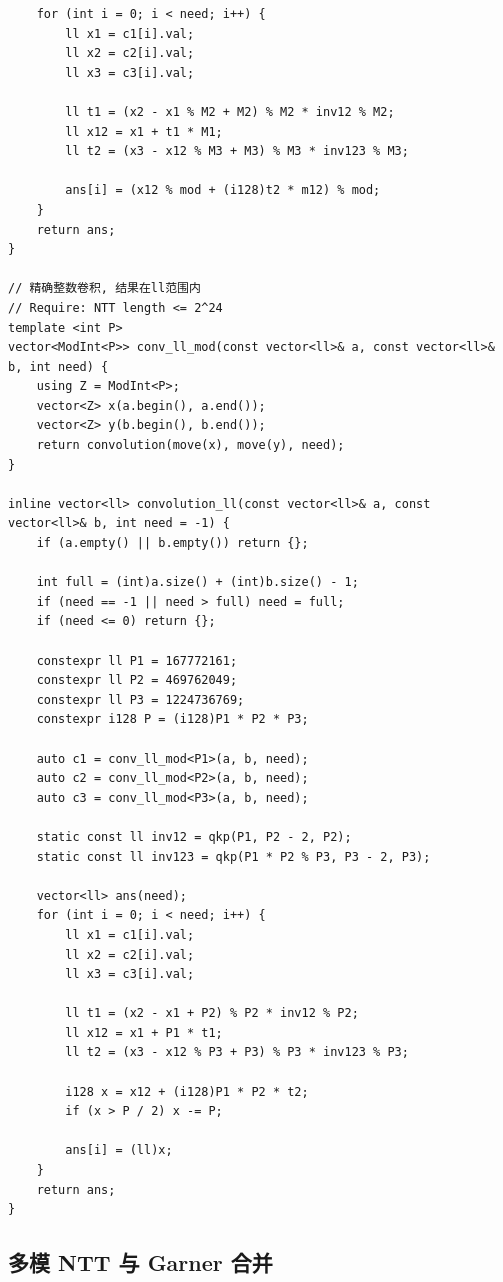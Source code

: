 \begin{lstlisting}
    for (int i = 0; i < need; i++) {
        ll x1 = c1[i].val;
        ll x2 = c2[i].val;
        ll x3 = c3[i].val;

        ll t1 = (x2 - x1 % M2 + M2) % M2 * inv12 % M2;
        ll x12 = x1 + t1 * M1;
        ll t2 = (x3 - x12 % M3 + M3) % M3 * inv123 % M3;

        ans[i] = (x12 % mod + (i128)t2 * m12) % mod;
    }
    return ans;
}

// 精确整数卷积, 结果在ll范围内
// Require: NTT length <= 2^24
template <int P>
vector<ModInt<P>> conv_ll_mod(const vector<ll>& a, const vector<ll>& b, int need) {
    using Z = ModInt<P>;
    vector<Z> x(a.begin(), a.end());
    vector<Z> y(b.begin(), b.end());
    return convolution(move(x), move(y), need);
}

inline vector<ll> convolution_ll(const vector<ll>& a, const vector<ll>& b, int need = -1) {
    if (a.empty() || b.empty()) return {};

    int full = (int)a.size() + (int)b.size() - 1;
    if (need == -1 || need > full) need = full;
    if (need <= 0) return {};

    constexpr ll P1 = 167772161;
    constexpr ll P2 = 469762049;
    constexpr ll P3 = 1224736769;
    constexpr i128 P = (i128)P1 * P2 * P3;

    auto c1 = conv_ll_mod<P1>(a, b, need);
    auto c2 = conv_ll_mod<P2>(a, b, need);
    auto c3 = conv_ll_mod<P3>(a, b, need);

    static const ll inv12 = qkp(P1, P2 - 2, P2);
    static const ll inv123 = qkp(P1 * P2 % P3, P3 - 2, P3);

    vector<ll> ans(need);
    for (int i = 0; i < need; i++) {
        ll x1 = c1[i].val;
        ll x2 = c2[i].val;
        ll x3 = c3[i].val;

        ll t1 = (x2 - x1 + P2) % P2 * inv12 % P2;
        ll x12 = x1 + P1 * t1;
        ll t2 = (x3 - x12 % P3 + P3) % P3 * inv123 % P3;

        i128 x = x12 + (i128)P1 * P2 * t2;
        if (x > P / 2) x -= P;

        ans[i] = (ll)x;
    }
    return ans;
}
\end{lstlisting}

\subsection{多模 NTT 与 Garner 合并}
\par

